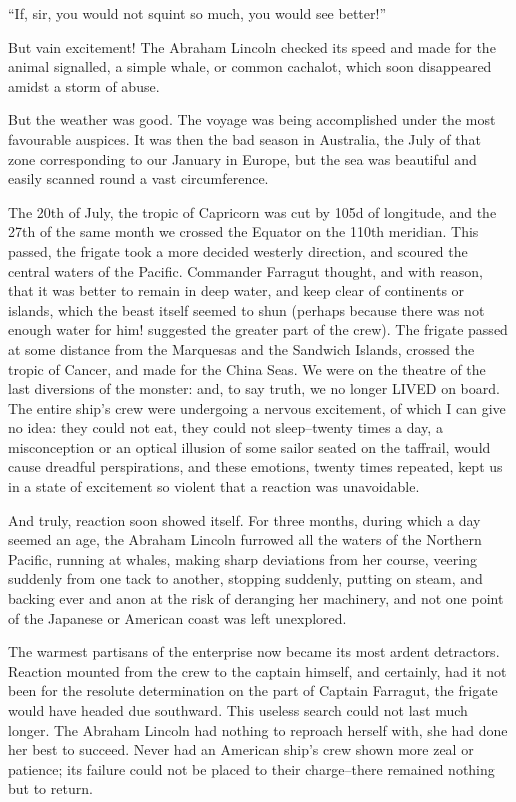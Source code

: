 ``If, sir, you would not squint so much, you would see better!''

But vain excitement!  The Abraham Lincoln checked its speed and made
for the animal signalled, a simple whale, or common cachalot,
which soon disappeared amidst a storm of abuse.

But the weather was good.  The voyage was being accomplished under
the most favourable auspices.  It was then the bad season in Australia,
the July of that zone corresponding to our January in Europe,
but the sea was beautiful and easily scanned round a vast circumference.

The 20th of July, the tropic of Capricorn was cut by 105d of longitude,
and the 27th of the same month we crossed the Equator on the 110th meridian.
This passed, the frigate took a more decided westerly direction,
and scoured the central waters of the Pacific.  Commander Farragut thought,
and with reason, that it was better to remain in deep water, and keep
clear of continents or islands, which the beast itself seemed to shun
(perhaps because there was not enough water for him! suggested
the greater part of the crew). The frigate passed at some distance from
the Marquesas and the Sandwich Islands, crossed the tropic of Cancer,
and made for the China Seas.  We were on the theatre of the last diversions
of the monster:  and, to say truth, we no longer LIVED on board.
The entire ship's crew were undergoing a nervous excitement, of which I
can give no idea:  they could not eat, they could not sleep--twenty times
a day, a misconception or an optical illusion of some sailor seated
on the taffrail, would cause dreadful perspirations, and these emotions,
twenty times repeated, kept us in a state of excitement so violent that a
reaction was unavoidable.

And truly, reaction soon showed itself.  For three months,
during which a day seemed an age, the Abraham Lincoln furrowed
all the waters of the Northern Pacific, running at whales,
making sharp deviations from her course, veering suddenly
from one tack to another, stopping suddenly, putting on steam,
and backing ever and anon at the risk of deranging her machinery,
and not one point of the Japanese or American coast
was left unexplored.

The warmest partisans of the enterprise now became its most
ardent detractors.  Reaction mounted from the crew to the captain himself,
and certainly, had it not been for the resolute determination on the part
of Captain Farragut, the frigate would have headed due southward.
This useless search could not last much longer.  The Abraham Lincoln
had nothing to reproach herself with, she had done her best to succeed.
Never had an American ship's crew shown more zeal or patience;
its failure could not be placed to their charge--there remained nothing
but to return.

